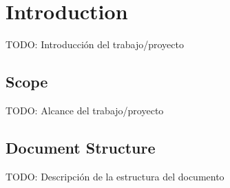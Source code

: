 \chapter{Introduction\label{chap:introduction}}

TODO: Introducción del trabajo/proyecto

\section{Scope}

TODO: Alcance del trabajo/proyecto

\section{Document Structure}

TODO: Descripción de la estructura del documento